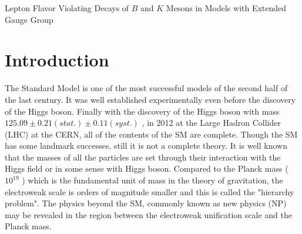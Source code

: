 \documentclass{ws-ijmpa}
\begin{document}

 {Lepton Flavor Violating Decays of $B$ and $K$ Mesons in Models with Extended Gauge Group}
%
%

\address{National Centre for Physics, Quaid-i-Azam University Campus,
Islamabad 45320, Pakistan}


\begin{history}
\end{history}

\section{Introduction}

The Standard Model is one of the most successful models of the second half of the last century. It was well established experimentally even before the discovery of the Higgs boson. Finally with the discovery of the Higgs boson with mass	$125.09\pm 0.21 (stat.) \pm 0.11 (syst.)$ , in 2012 at the Large Hadron Collider (LHC) at the CERN, all of the contents of the SM are complete. Though the SM has some landmark successes, still it is not a complete theory. It is well known that the masses of all the particles are set through their interaction with the Higgs field or in some sense with Higgs boson. Compared to the Planck mass ($10^{19}$ ) which is the fundamental unit of mass in the theory of gravitation, the electroweak scale is orders of magnitude smaller and this is called the "hierarchy problem". The physics beyond the SM, commonly known as new physics (NP) may be revealed in the region between the electroweak unification scale   and the Planck mass.
\end{document}
